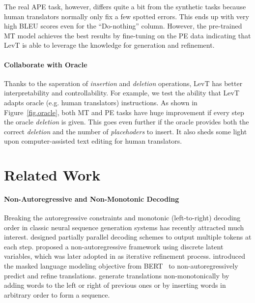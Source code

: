 \documentclass{article}
\begin{document}
The real APE task, however, differs quite a bit from the synthetic tasks because human translators normally only fix a few spotted errors. This ends up with very high BLEU scores even for the ``Do-nothing'' column. However, the pre-trained MT model achieves the best results by fine-tuning on the PE data indicating that LevT is able to leverage the knowledge for generation and refinement.




\paragraph{Collaborate with Oracle}
Thanks to the saperation of \textit{insertion} and \textit{deletion} operations, LevT has better interpretability and controllability. For example, we test the ability that LevT adapts oracle (e.g. human translators) instructions. As shown in Figure~\ref{fig.oracle}, both MT and PE tasks have huge improvement if every step the oracle \textit{deletion} is given. This goes even further if the oracle provides both the correct \textit{deletion} and the number of \textit{placehoders} to insert. It also sheds some light upon computer-assisted text editing for human translators.



\section{Related Work}
\paragraph{Non-Autoregressive and Non-Monotonic Decoding} Breaking the autoregressive constraints and monotonic (left-to-right) decoding order in classic neural sequence generation systems has recently attracted much interest. \cite{stern2018blockwise,wang2018semi} designed partially parallel decoding schemes to output multiple tokens at each step. \cite{gu2017non} proposed a non-autoregressive framework using discrete latent variables, which was later adopted in \cite{lee2018deterministic} as iterative refinement process.
\cite{levy2019constant} introduced the masked language modeling objective from BERT~\citep{devlin2018bert} to non-autoregressively predict and refine translations.  \cite{welleck2019non,stern2019insertion, gu2019insertion} generate translations non-monotonically by adding words to the left or right of previous ones or by inserting words in arbitrary order to form a sequence. 
\end{document}
